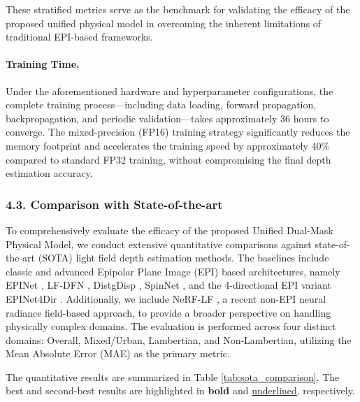 These stratified metrics serve as the benchmark for validating the efficacy of the proposed unified physical model in overcoming the inherent limitations of traditional EPI-based frameworks.

\paragraph{Training Time.}
Under the aforementioned hardware and hyperparameter configurations, the complete training process—including data loading, forward propagation, backpropagation, and periodic validation—takes approximately 36 hours to converge. The mixed-precision (FP16) training strategy significantly reduces the memory footprint and accelerates the training speed by approximately 40\% compared to standard FP32 training, without compromising the final depth estimation accuracy.

\subsubsection{4.3. Comparison with State-of-the-art}

To comprehensively evaluate the efficacy of the proposed Unified Dual-Mask Physical Model, we conduct extensive quantitative comparisons against state-of-the-art (SOTA) light field depth estimation methods. The baselines include classic and advanced Epipolar Plane Image (EPI) based architectures, namely EPINet \cite{shin2018epinet}, LF-DFN \cite{liang2019lfdfn}, DistgDisp \cite{wang2020distgdisp}, SpinNet \cite{cheng2021spinnet}, and the 4-directional EPI variant EPINet4Dir \cite{epinet4dir2022}. Additionally, we include NeRF-LF \cite{nerflf2023}, a recent non-EPI neural radiance field-based approach, to provide a broader perspective on handling physically complex domains. The evaluation is performed across four distinct domains: Overall, Mixed/Urban, Lambertian, and Non-Lambertian, utilizing the Mean Absolute Error (MAE) as the primary metric. 

The quantitative results are summarized in Table \ref{tab:sota_comparison}. The best and second-best results are highlighted in \textbf{bold} and \underline{underlined}, respectively.


